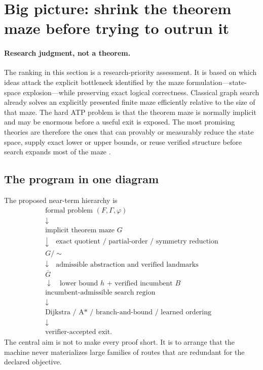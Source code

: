 \section{Big picture: shrink the theorem maze before trying to outrun it}
\label{sec:big-picture}

\paragraph{Research judgment, not a theorem.}
The ranking in this section is a research-priority assessment. It is based on which ideas attack the explicit bottleneck identified by the maze formulation---state-space explosion---while preserving exact logical correctness. Classical graph search already solves an explicitly presented finite maze efficiently relative to the size of that maze. The hard ATP problem is that the theorem maze is normally implicit and may be enormous before a useful exit is exposed. The most promising theories are therefore the ones that can provably or measurably reduce the state space, supply exact lower or upper bounds, or reuse verified structure before search expands most of the maze \cite{depths,horizon,data201}.

\subsection{The program in one diagram}
The proposed near-term hierarchy is
\[
\boxed{
\begin{array}{c}
\text{formal problem }(F,\Gamma,\varphi)\\[2pt]
\downarrow\\[2pt]
\text{implicit theorem maze }G\\[2pt]
\downarrow\quad \text{exact quotient / partial-order / symmetry reduction}\\[2pt]
G/\!\sim\\[2pt]
\downarrow\quad \text{admissible abstraction and verified landmarks}\\[2pt]
\bar G\\[2pt]
\downarrow\quad \text{lower bound }h\text{ + verified incumbent }B\\[2pt]
\text{incumbent-admissible search region}\\[2pt]
\downarrow\\[2pt]
\text{Dijkstra / A* / branch-and-bound / learned ordering}\\[2pt]
\downarrow\\[2pt]
\text{verifier-accepted exit.}
\end{array}}
\]
The central aim is not to make every proof short. It is to arrange that the machine never materializes large families of routes that are redundant for the declared objective.

